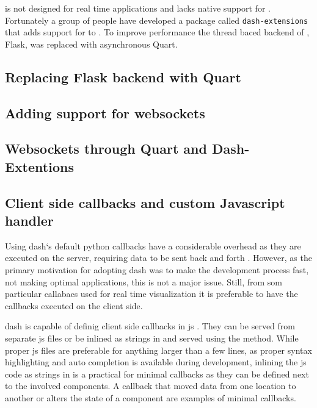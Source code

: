 \dash is not designed for real time applications and lacks native support for .
Fortunately a group of people have developed a package called \texttt{dash-extensions} that adds support for  to \dash \cite{eriksenDashExtensions}.
To improve performance the thread baced backend of \dash, Flask, was replaced with asynchronous Quart.

\subsection{Replacing Flask backend with Quart}

\subsection{Adding support for websockets}

\subsection{Websockets through Quart and Dash-Extentions}
\cite{plotlyLiveUpdatesDash}

\subsection{Client side callbacks and custom Javascript handler}
Using \gls{dash}`s default python callbacks have a considerable overhead as they are executed on the server, requiring data to be sent back and forth \cite{plotlyPartBasicCallbacks}.
However, as the primary motivation for adopting \gls{dash} was to make the development process fast, not making optimal applications, this is not a major issue.
Still, from som particular callabacs used for real time visualization it is preferable to have the callbacks executed on the client side.

\gls{dash} is capable of definig client side callbacks in \gls{js} \cite{plotlyClientsideCallbacksDash}.
They can be served from separate \gls{js} files or be inlined as strings in \py and served using the  method.
While proper \gls{js} files are preferable for anything larger than a few lines, as proper syntax highlighting and auto completion is available during development, inlining the \gls{js} code as strings in \py is a practical for minimal callbacks as they can be defined next to the involved components.
A callback that moved data from one location to another or alters the state of a component are examples of minimal callbacks.

